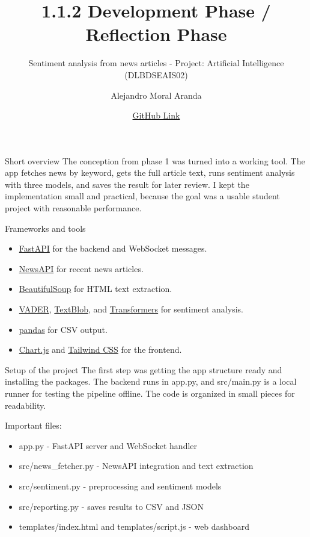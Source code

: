 \documentclass[aspectratio=169]{beamer}
\title{1.1.2 Development Phase / Reflection Phase}
\subtitle{Sentiment analysis from news articles - Project: Artificial Intelligence
(DLBDSEAIS02)
}
\author{Alejandro Moral Aranda}
\date{\href{https://github.com/alejandromoralwork/sentiment-analysis}{GitHub Link}}
\begin{document}
\begin{frame}
    \titlepage
\end{frame}

\begin{frame}{Short overview}
The conception from phase 1 was turned into a working tool. The app fetches news by keyword, gets the full article text, runs sentiment analysis with three models, and saves the result for later review. I kept the implementation small and practical, because the goal was a usable student project with reasonable performance.
\end{frame}

\begin{frame}{Frameworks and tools}
\begin{itemize}
    \item \href{https://fastapi.tiangolo.com/}{FastAPI} for the backend and WebSocket messages.
    \item \href{https://newsapi.org/}{NewsAPI} for recent news articles.
    \item \href{https://www.crummy.com/software/BeautifulSoup/bs4/doc/}{BeautifulSoup} for HTML text extraction.
    \item \href{https://www.nltk.org/vader.html}{VADER}, \href{https://textblob.readthedocs.io/}{TextBlob}, and \href{https://huggingface.co/docs/transformers/index}{Transformers} for sentiment analysis.
    \item \href{https://pandas.pydata.org/}{pandas} for CSV output.
    \item \href{https://www.chartjs.org/}{Chart.js} and \href{https://tailwindcss.com/}{Tailwind CSS} for the frontend.
\end{itemize}
\end{frame}

\begin{frame}{Setup of the project}
The first step was getting the app structure ready and installing the packages. The backend runs in app.py, and src/main.py is a local runner for testing the pipeline offline. The code is organized in small pieces for readability.

Important files:
\begin{itemize}
    \item app.py - FastAPI server and WebSocket handler
    \item src/news_fetcher.py - NewsAPI integration and text extraction
    \item src/sentiment.py - preprocessing and sentiment models
    \item src/reporting.py - saves results to CSV and JSON
    \item templates/index.html and templates/script.js - web dashboard
\end{itemize}
\end{frame}
\end{document}
